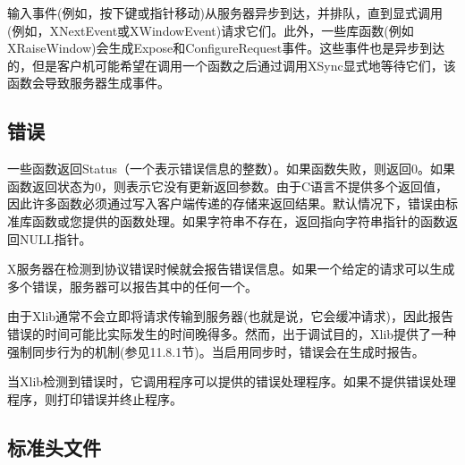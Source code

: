 输入事件(例如，按下键或指针移动)从服务器异步到达，并排队，直到显式调用(例如，XNextEvent或XWindowEvent)请求它们。此外，一些库函数(例如XRaiseWindow)会生成Expose和ConfigureRequest事件。这些事件也是异步到达的，但是客户机可能希望在调用一个函数之后通过调用XSync显式地等待它们，该函数会导致服务器生成事件。

\subsection{错误}

一些函数返回Status（一个表示错误信息的整数）。如果函数失败，则返回0。如果函数返回状态为0，则表示它没有更新返回参数。由于C语言不提供多个返回值，因此许多函数必须通过写入客户端传递的存储来返回结果。默认情况下，错误由标准库函数或您提供的函数处理。如果字符串不存在，返回指向字符串指针的函数返回NULL指针。

X服务器在检测到协议错误时候就会报告错误信息。如果一个给定的请求可以生成多个错误，服务器可以报告其中的任何一个。

由于Xlib通常不会立即将请求传输到服务器(也就是说，它会缓冲请求)，因此报告错误的时间可能比实际发生的时间晚得多。然而，出于调试目的，Xlib提供了一种强制同步行为的机制(参见11.8.1节)。当启用同步时，错误会在生成时报告。

当Xlib检测到错误时，它调用程序可以提供的错误处理程序。如果不提供错误处理程序，则打印错误并终止程序。

\subsection{标准头文件}

